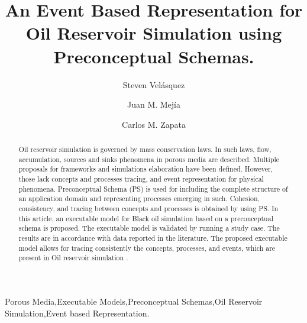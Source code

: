 \documentclass[review]{elsarticle}
\begin{document}
\begin{frontmatter}

\title{An Event Based Representation for Oil Reservoir Simulation using Preconceptual Schemas.}


\author[mymainaddress]{Steven Vel\'asquez}

\author[mysecondaryaddress1]{Juan M. Mej\'ia}
\author[mysecondaryaddress2]{Carlos M. Zapata}


\address[mymainaddress]{National University of Colombia, Medellin. Department of Computer and Decision Science.}
\address{
	}
\address[mysecondaryaddress1]{National University of Colombia, Medellin. Department of Processes and Energy.}
\address[mysecondaryaddress2]{National University of Colombia, Medellin. Department of Computer and Decision Science.}

\begin{abstract}
	Oil reservoir simulation is governed by mass conservation laws. In such laws, flow, accumulation, sources and sinks phenomena in porous media are described. Multiple proposals for frameworks and simulations elaboration have been defined. However, those lack concepts and processes tracing, and event representation for physical phenomena. Preconceptual Schema (PS) is used for including the complete structure of an application domain and representing processes emerging in such. Cohesion, consistency, and tracing between concepts and processes is obtained by using PS. In this article, an executable model for Black oil simulation based on a preconceptual schema is proposed. The executable model is validated by running a study case. The results are in accordance with data reported in the literature. The proposed executable model allows for tracing consistently the concepts, processes, and events, which are present in Oil reservoir simulation \cite{velasquez_chanci_modelo_2019}. 
\end{abstract}

\begin{keyword}
	Porous Media\sep Executable Models\sep Preconceptual Schemas\sep Oil Reservoir Simulation\sep Event based Representation.
\end{keyword}

\end{frontmatter}
\end{document}
